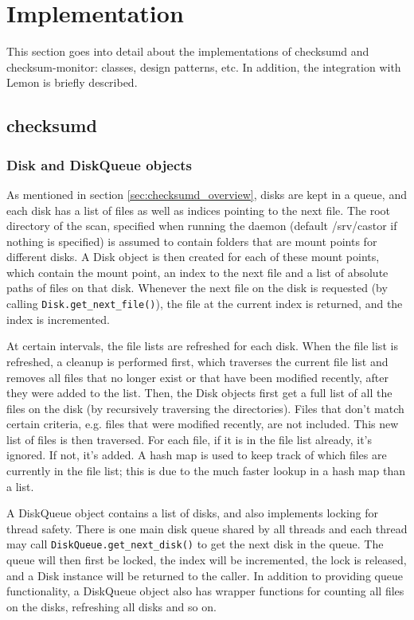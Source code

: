 \section{Implementation}
This section goes into detail about the implementations of checksumd and checksum-monitor: classes, design patterns, etc. In addition, the integration with Lemon is briefly described.

\subsection{checksumd}

\subsubsection{Disk and DiskQueue objects}
As mentioned in section \ref{sec:checksumd_overview}, disks are kept in a queue, and each disk has a list of files as well as indices pointing to the next file. The root directory of the scan, specified when running the daemon (default /srv/castor if nothing is specified) is assumed to contain folders that are mount points for different disks. A Disk object is then created for each of these mount points, which contain the mount point, an index to the next file and a list of absolute paths of files on that disk. Whenever the next file on the disk is requested (by calling {\tt Disk.get\_next\_file()}), the file at the current index is returned, and the index is incremented.

At certain intervals, the file lists are refreshed for each disk. When the file list is refreshed, a cleanup is performed first, which traverses the current file list and removes all files that no longer exist or that have been modified recently, after they were added to the list. Then, the Disk objects first get a full list of all the files on the disk (by recursively traversing the directories). Files that don't match certain criteria, e.g. files that were modified recently, are not included. This new list of files is then traversed. For each file, if it is in the file list already, it's ignored. If not, it's added. A hash map is used to keep track of which files are currently in the file list; this is due to the much faster lookup in a hash map than a list.

A DiskQueue object contains a list of disks, and also implements locking for thread safety. There is one main disk queue shared by all threads and each thread may call {\tt DiskQueue.get\_next\_disk()} to get the next disk in the queue. The queue will then first be locked, the index will be incremented, the lock is released, and a Disk instance will be returned to the caller. In addition to providing queue functionality, a DiskQueue object also has wrapper functions for counting all files on the disks, refreshing all disks and so on.

